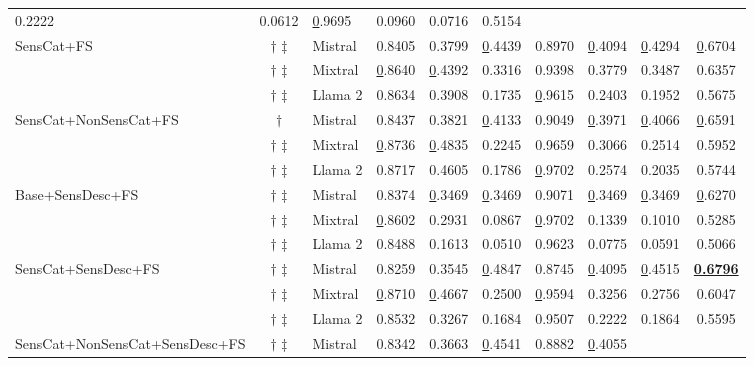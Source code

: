\begin{table*}[!h]
\begin{tabular}{@{}lclccccccc@{}}
  0.2222 &
  0.0612 &
  {\ul 0.9695} &
  0.0960 &
  0.0716 &
  0.5154 \\ \cmidrule(l){3-10}
\multirow{3}{*}{SensCat+FS} &
  $\dagger$ $\ddagger$ &
  Mistral &
  0.8405 &
  0.3799 &
  {\ul 0.4439} &
  0.8970 &
  {\ul 0.4094} &
  {\ul 0.4294} &
  {\ul 0.6704} \\
 &
  $\dagger$ $\ddagger$ &
  Mixtral &
  {\ul 0.8640} &
  {\ul 0.4392} &
  0.3316 &
  0.9398 &
  0.3779 &
  0.3487 &
  0.6357 \\
 &
  $\dagger$ $\ddagger$ &
  Llama 2 &
  0.8634 &
  0.3908 &
  0.1735 &
  {\ul 0.9615} &
  0.2403 &
  0.1952 &
  0.5675 \\ \cmidrule(l){3-10}
\multirow{3}{*}{SensCat+NonSensCat+FS} &
  $\dagger$ \hspace{0.46em} &
  Mistral &
  0.8437 &
  0.3821 &
  {\ul 0.4133} &
  0.9049 &
  {\ul 0.3971} &
  {\ul 0.4066} &
  {\ul 0.6591} \\
 &
  $\dagger$ $\ddagger$ &
  Mixtral &
  {\ul 0.8736} &
  {\ul 0.4835} &
  0.2245 &
  0.9659 &
  0.3066 &
  0.2514 &
  0.5952 \\
 &
  $\dagger$ $\ddagger$ &
  Llama 2 &
  0.8717 &
  0.4605 &
  0.1786 &
  {\ul 0.9702} &
  0.2574 &
  0.2035 &
  0.5744 \\ \cmidrule(l){3-10}
\multirow{3}{*}{Base+SensDesc+FS} &
  $\dagger$ $\ddagger$ &
  Mistral &
  0.8374 &
  {\ul 0.3469} &
  {\ul 0.3469} &
  0.9071 &
  {\ul 0.3469} &
  {\ul 0.3469} &
  {\ul 0.6270} \\
 &
  $\dagger$ $\ddagger$ &
  Mixtral &
  {\ul 0.8602} &
  0.2931 &
  0.0867 &
  {\ul 0.9702} &
  0.1339 &
  0.1010 &
  0.5285 \\
 &
  $\dagger$ $\ddagger$ &
  Llama 2 &
  0.8488 &
  0.1613 &
  0.0510 &
  0.9623 &
  0.0775 &
  0.0591 &
  0.5066 \\ \cmidrule(l){3-10}
\multirow{3}{*}{SensCat+SensDesc+FS} &
  $\dagger$ $\ddagger$ &
  Mistral &
  0.8259 &
  0.3545 &
  {\ul 0.4847} &
  0.8745 &
  {\ul 0.4095} &
  {\ul 0.4515} &
  {\ul \textbf{0.6796}} \\
 &
  $\dagger$ $\ddagger$ &
  Mixtral &
  {\ul 0.8710} &
  {\ul 0.4667} &
  0.2500 &
  {\ul 0.9594} &
  0.3256 &
  0.2756 &
  0.6047 \\
 &
  $\dagger$ $\ddagger$ &
  Llama 2 &
  0.8532 &
  0.3267 &
  0.1684 &
  0.9507 &
  0.2222 &
  0.1864 &
  0.5595 \\ \cmidrule(l){3-10}
\multirow{3}{*}{SensCat+NonSensCat+SensDesc+FS} &
  $\dagger$ $\ddagger$ &
  Mistral &
  0.8342 &
  0.3663 &
  {\ul 0.4541} &
  0.8882 &
  {\ul 0.4055} &

\end{tabular}
\end{table*}
